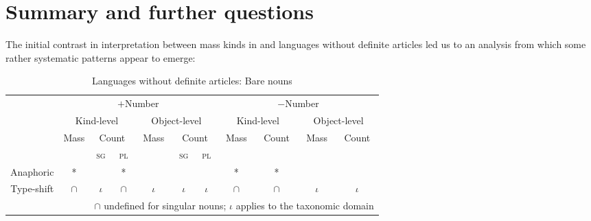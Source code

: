 \documentclass[output=paper,
modfonts
]{langscibook}
\begin{document}
	\section{Summary and further questions} \label{sec:despic:5} 
	
	The initial contrast in interpretation between mass kinds in  and languages without
	definite articles led us to an analysis from which some rather systematic patterns appear to emerge: 
	
	\begin{table} 
		\caption{Languages without definite articles: Bare nouns}
		\begin{tabular}{c|c|c|c|c|c|c|c|c|c|c|}
			\cline{2-11}
			& \multicolumn{6}{|c|}{$+${\footnotesize Number}} & \multicolumn{4}{|c|}{$-${\footnotesize Number}} \\
			\cline{2-11}
			& 
			\multicolumn{3}{|c|}{{{\footnotesize Kind-level}}} & \multicolumn{3}{|c|}{{{\footnotesize Object-level}}} & \multicolumn{2}{|c|}{{{\footnotesize Kind-level}}} & \multicolumn{2}{|c|}{{{\footnotesize Object-level}}} \\
			\cline{2-11}
			& \footnotesize Mass & \multicolumn{2}{|c|}{\footnotesize Count} & \footnotesize Mass & \multicolumn{2}{|c|}{\footnotesize Count} & \footnotesize Mass & \footnotesize Count & \footnotesize Mass & \footnotesize Count \\
			\cline{2-11}
			& \cellcolor{lightgray} & \cellcolor{gray}\textsc{sg} & \textsc{pl} & \cellcolor{lightgray} & \textsc{sg} & \textsc{pl} & \cellcolor{lightgray} & \cellcolor{lightgray} & \cellcolor{lightgray} & \cellcolor{lightgray} \\
			
			\hline
			\multicolumn{1}{|c|}{\footnotesize {Anaphoric}} & * & \cellcolor{gray}\checkmark & * & \checkmark & \checkmark & \checkmark & * & * & \checkmark & \checkmark \\
			
			\hline
			\multicolumn{1}{|c|}{\footnotesize {Type-shift}} & $\cap$ & \cellcolor{gray}$\iota$ & $\cap$ & $\iota$  & $\iota$ & $\iota$ & $\cap$ & $\cap$ & $\iota$ & $\iota$ \\ \hline
			\multicolumn{2}{c}{} & \multicolumn{9}{l}{\rotatebox[origin=c]{90}{$\Rsh$} \footnotesize $\cap$ undefined for singular nouns; $\iota$ applies to the taxonomic domain
			}
		\end{tabular}
		\label{tab:despic:1}
	\end{table}
	
\end{document}
